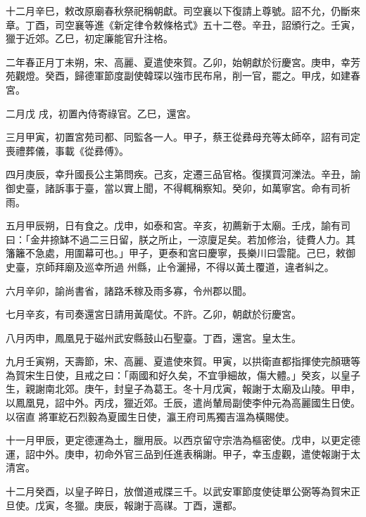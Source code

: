 \begin{pinyinscope}
 十二月辛巳，敕改原廟春秋祭祀稱朝獻。司空襄以下復請上尊號。詔不允，仍斷來章。丁酉，司空襄等進《新定律令敕條格式》五十二卷。辛丑，詔頒行之。壬寅，獵于近郊。乙巳，初定廉能官升注格。



 二年春正月丁未朔，宋、高麗、夏遣使來賀。乙卯，始朝獻於衍慶宮。庚申，幸芳苑觀燈。癸酉，歸德軍節度副使韓琛以強市民布帛，削一官，罷之。甲戌，如建春宮。



 二月戊
 戌，初置內侍寄祿官。乙巳，還宮。



 三月甲寅，初置宮苑司都、同監各一人。甲子，蔡王從彞母充等太師卒，詔有司定喪禮葬儀，事載《從彞傅》。



 四月庚辰，幸升國長公主第問疾。己亥，定遷三品官格。復撲買河濼法。辛丑，諭御史臺，諸訴事于臺，當以實上聞，不得輒稱察知。癸卯，如萬寧宮。命有司祈雨。



 五月甲辰朔，日有食之。戊申，如泰和宮。辛亥，初薦新于太廟。壬戌，諭有司曰：「金井捺缽不過二三日留，朕之所止，一涼廈足矣。若加修治，徒費人力。其籓籬不急處，用圍幕可也。」甲子，更泰和宮曰慶寧，長樂川曰雲龍。己巳，敕御史臺，京師拜廟及巡幸所過
 州縣，止令灑掃，不得以黃土覆道，違者糾之。



 六月辛卯，諭尚書省，諸路禾稼及雨多寡，令州郡以聞。



 七月辛亥，有司奏還宮日請用黃麾仗。不許。乙卯，朝獻於衍慶宮。



 八月丙申，鳳凰見于磁州武安縣鼓山石聖臺。丁酉，還宮。皇太生。



 九月壬寅朔，天壽節，宋、高麗、夏遣使來賀。甲寅，以拱衛直都指揮使完顏瑭等為賀宋生日使，且戒之曰：「兩國和好久矣，不宜爭細故，傷大體。」癸亥，以皇子生，親謝南北郊。庚午，封皇子為葛王。冬十月戊寅，報謝于太廟及山陵。甲申，以鳳凰見，詔中外。丙戌，獵近郊。壬辰，遣尚輦局副使李仲元為高麗國生日使。以宿直
 將軍紇石烈毅為夏國生日使，瀛王府司馬獨吉溫為橫賜使。



 十一月甲辰，更定德運為土，臘用辰。以西京留守宗浩為樞密使。戊申，以更定德運，詔中外。庚申，初命外官三品到任進表稱謝。甲子，幸玉虛觀，遣使報謝于太清宮。



 十二月癸酉，以皇子晬日，放僧道戒牒三千。以武安軍節度使徒單公弼等為賀宋正旦使。戊寅，冬獵。庚辰，報謝于高禖。丁酉，還都。




\end{pinyinscope}
